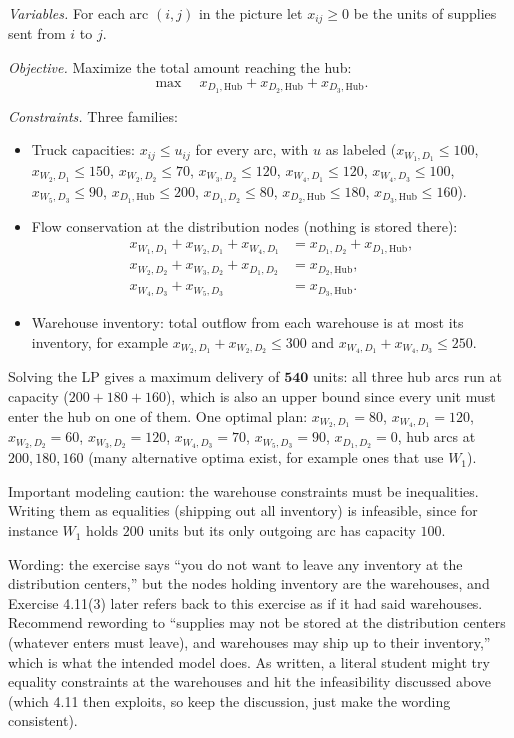 \emph{Variables.} For each arc $(i,j)$ in the picture let $x_{ij} \geq 0$ be the units of supplies sent from $i$ to $j$.

\emph{Objective.} Maximize the total amount reaching the hub:
\[
\max \quad x_{D_1,\mathrm{Hub}} + x_{D_2,\mathrm{Hub}} + x_{D_3,\mathrm{Hub}}.
\]

\emph{Constraints.} Three families:
\begin{itemize}
\item Truck capacities: $x_{ij} \leq u_{ij}$ for every arc, with $u$ as labeled ($x_{W_1,D_1} \leq 100$, $x_{W_2,D_1} \leq 150$, $x_{W_2,D_2} \leq 70$, $x_{W_3,D_2} \leq 120$, $x_{W_4,D_1} \leq 120$, $x_{W_4,D_3} \leq 100$, $x_{W_5,D_3} \leq 90$, $x_{D_1,\mathrm{Hub}} \leq 200$, $x_{D_1,D_2} \leq 80$, $x_{D_2,\mathrm{Hub}} \leq 180$, $x_{D_3,\mathrm{Hub}} \leq 160$).
\item Flow conservation at the distribution nodes (nothing is stored there):
\begin{align*}
x_{W_1,D_1} + x_{W_2,D_1} + x_{W_4,D_1} &= x_{D_1,D_2} + x_{D_1,\mathrm{Hub}},\\
x_{W_2,D_2} + x_{W_3,D_2} + x_{D_1,D_2} &= x_{D_2,\mathrm{Hub}},\\
x_{W_4,D_3} + x_{W_5,D_3} &= x_{D_3,\mathrm{Hub}}.
\end{align*}
\item Warehouse inventory: total outflow from each warehouse is at most its inventory, for example $x_{W_2,D_1} + x_{W_2,D_2} \leq 300$ and $x_{W_4,D_1} + x_{W_4,D_3} \leq 250$.
\end{itemize}

Solving the LP gives a maximum delivery of $\mathbf{540}$ units: all three hub arcs run at capacity ($200 + 180 + 160$), which is also an upper bound since every unit must enter the hub on one of them. One optimal plan: $x_{W_2,D_1} = 80$, $x_{W_4,D_1} = 120$, $x_{W_2,D_2} = 60$, $x_{W_3,D_2} = 120$, $x_{W_4,D_3} = 70$, $x_{W_5,D_3} = 90$, $x_{D_1,D_2} = 0$, hub arcs at $200, 180, 160$ (many alternative optima exist, for example ones that use $W_1$).

Important modeling caution: the warehouse constraints must be inequalities. Writing them as equalities (shipping out all inventory) is infeasible, since for instance $W_1$ holds $200$ units but its only outgoing arc has capacity $100$.

\begin{qaflag}
Wording: the exercise says ``you do not want to leave any inventory at the distribution centers,'' but the nodes holding inventory are the warehouses, and Exercise 4.11(3) later refers back to this exercise as if it had said warehouses. Recommend rewording to ``supplies may not be stored at the distribution centers (whatever enters must leave), and warehouses may ship up to their inventory,'' which is what the intended model does. As written, a literal student might try equality constraints at the warehouses and hit the infeasibility discussed above (which 4.11 then exploits, so keep the discussion, just make the wording consistent).
\end{qaflag}

